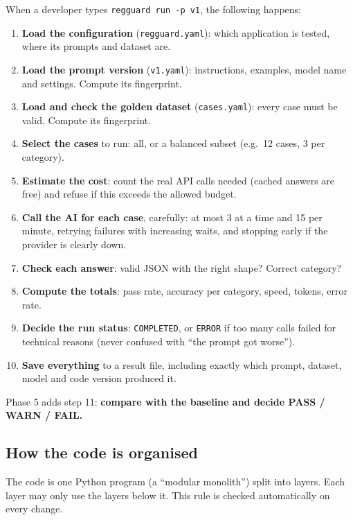 \documentclass[11pt,a4paper]{article}
\newcommand{\code}[1]{\nolinkurl{#1}}
\begin{document}
When a developer types \texttt{regguard run -p v1}, the following happens:
\begin{enumerate}
  \item \textbf{Load the configuration} (\code{regguard.yaml}): which application is tested,
        where its prompts and dataset are.
  \item \textbf{Load the prompt version} (\code{v1.yaml}): instructions, examples, model name
        and settings. Compute its fingerprint.
  \item \textbf{Load and check the golden dataset} (\code{cases.yaml}): every case must be
        valid. Compute its fingerprint.
  \item \textbf{Select the cases} to run: all, or a balanced subset (e.g.\ 12 cases, 3 per category).
  \item \textbf{Estimate the cost}: count the real API calls needed (cached answers are free)
        and refuse if this exceeds the allowed budget.
  \item \textbf{Call the AI for each case}, carefully: at most 3 at a time and 15 per minute,
        retrying failures with increasing waits, and stopping early if the provider is clearly down.
  \item \textbf{Check each answer}: valid JSON with the right shape? Correct category?
  \item \textbf{Compute the totals}: pass rate, accuracy per category, speed, tokens, error rate.
  \item \textbf{Decide the run status}: \code{COMPLETED}, or \code{ERROR} if too many calls
        failed for technical reasons (never confused with ``the prompt got worse'').
  \item \textbf{Save everything} to a result file, including exactly which prompt, dataset,
        model and code version produced it.
\end{enumerate}
Phase 5 adds step 11: \textbf{compare with the baseline and decide PASS / WARN / FAIL.}

\subsection{How the code is organised}

The code is one Python program (a ``modular monolith'') split into layers. Each layer may
only use the layers below it. This rule is checked automatically on every change.
\end{document}
